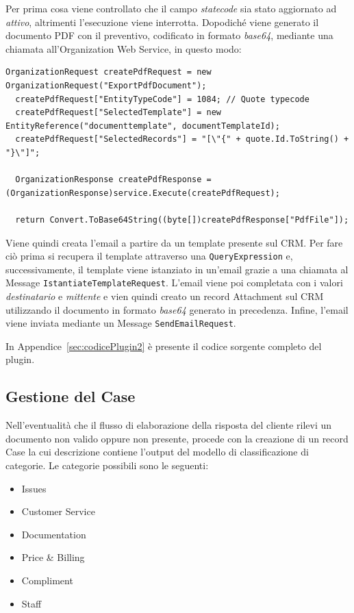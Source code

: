 Per prima cosa viene controllato che il campo \textit{statecode} sia stato aggiornato ad \textit{attivo}, altrimenti l'esecuzione viene interrotta.
Dopodiché viene generato il documento PDF con il preventivo, codificato in formato \textit{base64}, mediante una chiamata all'Organization Web Service, in questo modo:

\begin{lstlisting}[language={[Sharp]C},breaklines=true]
  OrganizationRequest createPdfRequest = new OrganizationRequest("ExportPdfDocument");
  createPdfRequest["EntityTypeCode"] = 1084; // Quote typecode
  createPdfRequest["SelectedTemplate"] = new EntityReference("documenttemplate", documentTemplateId);
  createPdfRequest["SelectedRecords"] = "[\"{" + quote.Id.ToString() + "}\"]";

  OrganizationResponse createPdfResponse = (OrganizationResponse)service.Execute(createPdfRequest);

  return Convert.ToBase64String((byte[])createPdfResponse["PdfFile"]);
\end{lstlisting}

Viene quindi creata l'email a partire da un template presente sul CRM. Per fare ciò prima si recupera il template attraverso una \lstinline[language={[Sharp]C}]{QueryExpression} e, successivamente, il template viene istanziato in un'email grazie a una chiamata al Message \lstinline[language={[Sharp]C}]{IstantiateTemplateRequest}.
L'email viene poi completata con i valori \textit{destinatario} e \textit{mittente} e vien quindi creato un record Attachment sul CRM utilizzando il documento in formato \textit{base64} generato in precedenza.
Infine, l'email viene inviata mediante un Message \lstinline[language={[Sharp]C}]{SendEmailRequest}.

In Appendice~\ref{sec:codicePlugin2} è presente il codice sorgente completo del plugin.

\subsection{Gestione del Case}
Nell'eventualità che il flusso di elaborazione della risposta del cliente rilevi un documento non valido oppure non presente, procede con la creazione di un record Case la cui descrizione contiene l'output del modello di classificazione di categorie.
Le categorie possibili sono le seguenti:
\begin{itemize}
  \item Issues
  \item Customer Service
  \item Documentation
  \item Price \& Billing
  \item Compliment
  \item Staff
\end{itemize}


